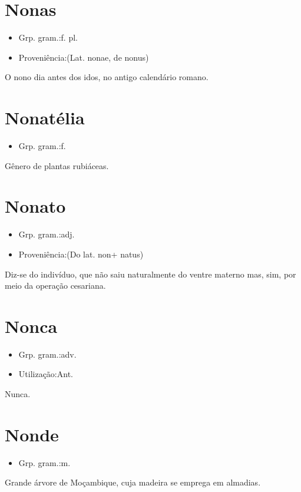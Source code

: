 \section{Nonas}
\begin{itemize}
\item {Grp. gram.:f. pl.}
\end{itemize}
\begin{itemize}
\item {Proveniência:(Lat. \textunderscore nonae\textunderscore , de \textunderscore nonus\textunderscore )}
\end{itemize}
O nono dia antes dos idos, no antigo calendário romano.
\section{Nonatélia}
\begin{itemize}
\item {Grp. gram.:f.}
\end{itemize}
Gênero de plantas rubiáceas.
\section{Nonato}
\begin{itemize}
\item {Grp. gram.:adj.}
\end{itemize}
\begin{itemize}
\item {Proveniência:(Do lat. \textunderscore non\textunderscore  + \textunderscore natus\textunderscore )}
\end{itemize}
Diz-se do indivíduo, que não saiu naturalmente do ventre materno mas, sim, por meio da operação cesariana.
\section{Nonca}
\begin{itemize}
\item {Grp. gram.:adv.}
\end{itemize}
\begin{itemize}
\item {Utilização:Ant.}
\end{itemize}
Nunca.
\section{Nonde}
\begin{itemize}
\item {Grp. gram.:m.}
\end{itemize}
Grande árvore de Moçambique, cuja madeira se emprega em almadias.
